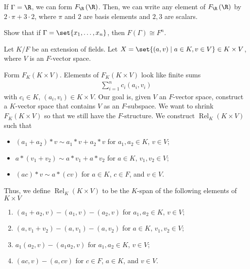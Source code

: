 \documentclass[10pt]{mypackage}
\begin{document}
\begin{example}
  If $\Gamma = \R$, we can form $F_{\R}\left(\R\right)$. Then, we can write any element of $F_{\R}\left(\R\right)$ by $2\cdot \pi + 3\cdot 2$, where $\pi$ and $2$ are basis elements and $2,3$ are scalars.
\end{example}
\begin{exercise}
  Show that if $\Gamma = \set{x_1,\dots,x_n}$, then $F\left(\Gamma\right) \cong F^{n}$.
\end{exercise}
\begin{definition}
  Let $K/F$ be an extension of fields. Let $X = \set{\left(a,v\right)\mid a\in K,v\in V}\in K\times V$, where $V$ is an $F$-vector space.\newline

  Form $F_{K}\left(K\times V\right)$. Elements of $F_{K}\left(K\times V\right)$ look like finite sums
  \begin{align*}
    \sum_{i=1}^{n}c_i\left(a_i,v_i\right)
  \end{align*}
  with $c_i\in K$, $\left(a_i,v_i\right)\in K\times V$.
  Our goal is, given $V$ an $F$-vector space, construct a $K$-vector space that contains $V$ as an $F$-subspace. We want to shrink $F_{K}\left(K\times V\right)$ so that we still have the $F$-structure. We construct $\operatorname{Rel}_{K}\left(K\times V\right)$ such that
  \begin{itemize}
    \item $\left(a_1 + a_2\right)\ast v \sim a_1\ast v + a_2\ast v$ for $a_1,a_2\in K$, $v\in V$;
    \item $a\ast \left(v_1 + v_2\right) \sim a\ast v_1 + a\ast v_2$ for $a\in K$, $v_1,v_2\in V$;
    \item $\left(ac\right)\ast v \sim a\ast \left(cv\right)$ for $a\in K$, $c\in F$, and $v\in V$.
  \end{itemize}
  Thus, we define $\operatorname{Rel}_{K}\left(K\times V\right)$ to be the $K$-span of the following elements of $K\times V$
  \begin{enumerate}[(1)]
    \item $\left(a_1 + a_2,v\right) - \left(a_1,v\right) - \left(a_2,v\right)$ for $a_1,a_2\in K$, $v\in V$;
    \item $\left(a,v_1 + v_2\right) - \left(a,v_1\right) - \left(a,v_2\right)$ for $a\in K$, $v_1,v_2\in V$;
    \item $a_1\left(a_2,v\right) - \left(a_1a_2,v\right)$ for $a_1,a_2\in K$, $v\in V$;
    \item $\left(ac,v\right)-\left(a,cv\right)$ for $c\in F$, $a\in K$, and $v\in V$.

\end{enumerate}
\end{definition}
\end{document}
